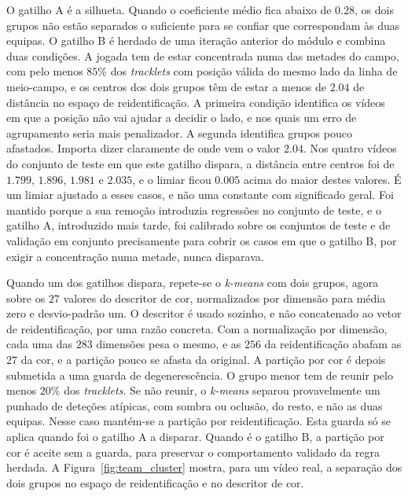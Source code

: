 O gatilho A é a silhueta. Quando o coeficiente médio fica abaixo de $0.28$, os dois grupos não
estão separados o suficiente para se confiar que correspondam às duas equipas. O gatilho B é
herdado de uma iteração anterior do módulo e combina duas condições. A jogada tem de estar
concentrada numa das metades do campo, com pelo menos $85\%$ dos \emph{tracklets} com posição
válida do mesmo lado da linha de meio-campo, e os centros dos dois grupos têm de estar a menos de
$2.04$ de distância no espaço de reidentificação. A primeira condição identifica os vídeos em que
a posição não vai ajudar a decidir o lado, e nos quais um erro de agrupamento seria mais
penalizador. A segunda identifica grupos pouco afastados. Importa dizer claramente de onde vem o
valor $2.04$. Nos quatro vídeos do conjunto de teste em que este gatilho dispara, a distância
entre centros foi de $1.799$, $1.896$, $1.981$ e $2.035$, e o limiar ficou $0.005$ acima do maior
destes valores. É um limiar ajustado a esses casos, e não uma constante com significado
geral. Foi mantido porque a sua remoção introduzia regressões no conjunto de teste, e o gatilho A,
introduzido mais tarde, foi calibrado sobre os conjuntos de teste e de validação em conjunto
precisamente para cobrir os casos em que o gatilho B, por exigir a concentração numa metade, nunca
disparava.

Quando um dos gatilhos dispara, repete-se o \emph{k-means} com dois grupos, agora sobre os $27$
valores do descritor de cor, normalizados por dimensão para média zero e desvio-padrão um. O
descritor é usado sozinho, e não concatenado ao vetor de reidentificação, por uma razão
concreta. Com a normalização por dimensão, cada uma das $283$ dimensões pesa o mesmo, e as $256$ da
reidentificação abafam as $27$ da cor, e a partição pouco se afasta da original. A partição por cor é depois submetida a uma guarda de
degenerescência. O grupo menor tem de reunir pelo menos $20\%$ dos \emph{tracklets}. Se não
reunir, o \emph{k-means} separou provavelmente um punhado de deteções atípicas, com sombra ou
oclusão, do resto, e não as duas equipas. Nesse caso mantém-se a partição por reidentificação.
Esta guarda só se aplica quando foi o gatilho A a disparar. Quando é o gatilho B, a partição por
cor é aceite sem a guarda, para preservar o comportamento validado da regra herdada. A
Figura~\ref{fig:team_cluster} mostra, para um vídeo real, a separação dos dois grupos no espaço de
reidentificação e no descritor de cor.

